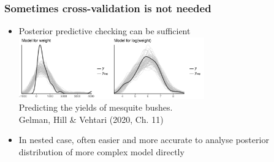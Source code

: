 \documentclass[10pt]{beamer}
\begin{document}
\begin{frame}

\frametitle{Sometimes cross-validation is not needed}

\vspace{-0.5\baselineskip}

  \begin{itemize}
  \item Posterior predictive checking can be sufficient\\
    \vspace{0.5\baselineskip}
    \includegraphics[width=8cm]{figs/mesquite_ppc.pdf}\\
  \vspace{-0.1\baselineskip} {Predicting the yields of mesquite bushes.\\
    \color{gray} \footnotesize
    Gelman, Hill \& Vehtari (2020, Ch. 11)}
  \pause
  \item In nested case, often easier and more accurate to analyse posterior distribution of more complex model directly
  \end{itemize}
\end{frame}


\end{document}
